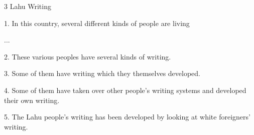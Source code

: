 
3 Lahu Writing

1. In this country, several different kinds of people are living

...

2. These various peoples have several kinds of writing.

3. Some of them have writing which they themselves developed.

4. Some of them have taken over other people's writing systems and developed their
own writing.

5. The Lahu people's writing has been developed by looking at white foreigners'
writing.


